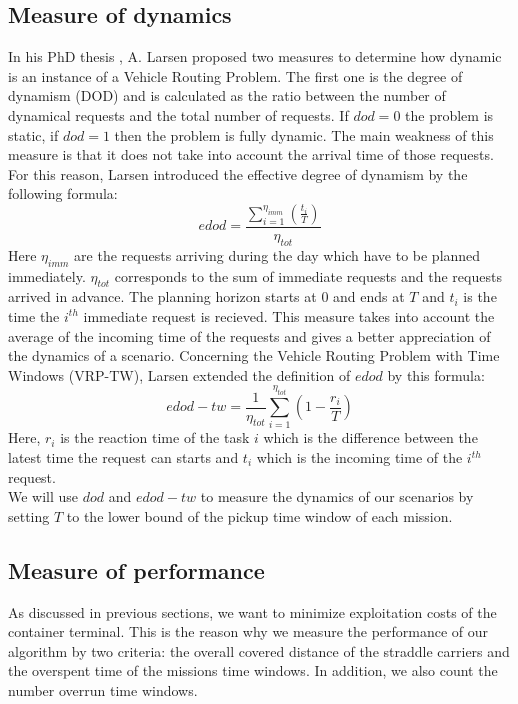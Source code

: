 \documentclass[a4paper,10pt]{article}
\begin{document}
	\subsection{Measure of dynamics}
In his PhD thesis \cite{Larsen00}, A. Larsen proposed two measures to determine how dynamic is an instance of a Vehicle Routing Problem. The first one is the degree of dynamism (DOD) and is calculated as the ratio between the number of dynamical requests and the total number of requests. If $dod=0$ the problem is static, if $dod=1$ then the problem is fully dynamic. The main weakness of this measure is that it does not take into account the arrival time of those requests. For this reason, Larsen introduced the effective degree of dynamism by the following formula: 
\begin{equation*}
 edod = \frac{\sum_{i=1}^{\eta_{imm}}\left(\frac{t_i}{T}\right)}{\eta_{tot}}
\end{equation*}
Here $\eta_{imm}$ are the requests arriving during the day which have to be planned immediately. $\eta_{tot}$ corresponds to the sum of immediate requests and the requests arrived in advance. The planning horizon starts at $0$ and ends at $T$ and $t_i$ is the time the $i^{th}$ immediate request is recieved. This measure takes into account the average of the incoming time of the requests and gives a better appreciation of the dynamics of a scenario.
Concerning the Vehicle Routing Problem with Time Windows (VRP-TW), Larsen extended the definition of $edod$ by this formula: 
\begin{equation*}
 edod-tw = \frac{1}{\eta_{tot}} \sum_{i=1}^{\eta_{tot}} \left(1 - \frac{r_i}{T}\right)
\end{equation*}
Here, $r_i$ is the reaction time of the task $i$ which is the difference between the latest time the request can starts and $t_i$ which is the incoming time of the $i^{th}$ request.\\

We will use $dod$ and $edod-tw$ to measure the dynamics of our scenarios by setting $T$ to the lower bound of the pickup time window of each mission.

	\subsection{Measure of performance}
As discussed in previous sections, we want to minimize exploitation costs of the container terminal. This is the reason why we measure the performance of our algorithm by two criteria: the overall covered distance of the straddle carriers and the overspent time of the missions time windows. In addition, we also count the number overrun time windows.
\end{document}
